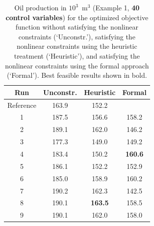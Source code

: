 \documentclass[twocolumn,numbook]{svjour3}          %
\begin{document}
\begin{table}
\centering
\caption{Oil production in $10^3$~m$^3$ (Example 1, {\bf 40 control variables}) for the optimized objective function
         without satisfying the nonlinear constraints (`Unconstr.'), satisfying the nonlinear constraints
         using the heuristic treatment (`Heuristic'), and satisfying the nonlinear constraints
         using the formal approach (`Formal'). Best feasible results shown in bold.}
\begin{tabular}{|c|c|c|c|}
\hline
   Run & Unconstr. & Heuristic & Formal                       \\
\hline
Reference    & 163.9         &  152.2                      &                           \\
1                     & 187.5         &  156.6                      &        158.2        \\
2                     & 189.1         &  162.0                      &        146.2        \\
3                     & 177.3         &  149.0                      &        149.2        \\
4                     & 183.4         &  150.2                      & \bf{ 160.6 }      \\
5                     & 186.1         &  152.2                      &        152.9        \\
6                     & 185.0         &  158.9                      &        160.2        \\
7                     & 190.2         &  162.3                      &        142.5        \\ 
8                     & 190.1         &\bf{163.5}                 &        158.5        \\
9                     & 190.1         &     162.0                   &        158.0        \\
\hline
\end{tabular}
  \label{table:PiC500Steps8}
\end{table}
\end{document}
